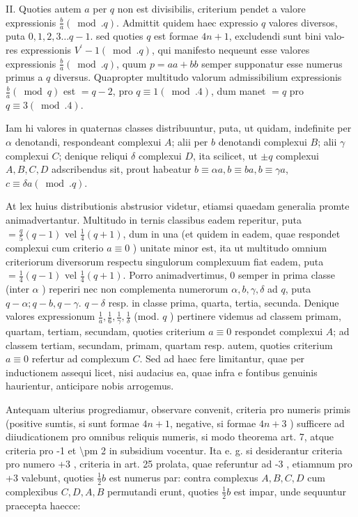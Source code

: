 \documentclass[10pt]{article}
\begin{document}
II. Quoties autem \(a\) per \(q\) non est divisibilis, criterium pendet a valore expressionis \(\frac{b}{a}(\bmod . q)\). Admittit quidem haec expressio \(q\) valores diversos, puta \(0,1,2,3 \ldots q-1\). sed quoties \(q\) est formae \(4 n+1\), excludendi sunt bini valo-
res expressionis \(V^{\prime}-1(\bmod . q)\), qui manifesto nequeunt esse valores expressionis \(\frac{b}{a}(\bmod . q)\), quum \(p=a a+b b\) semper supponatur esse numerus primus a \(q\) diversus. Quapropter multitudo valorum admissibilium expressionis \(\frac{b}{a}(\bmod q)\) est \(=q-2\), pro \(q \equiv 1(\bmod .4)\), dum manet \(=q\) pro \(q \equiv 3(\bmod .4)\).

Iam hi valores in quaternas classes distribuuntur, puta, ut quidam, indefinite per \(\alpha\) denotandi, respondeant complexui \(A\); alii per \(b\) denotandi complexui \(B\); alii \(\gamma\) complexui \(C\); denique reliqui \(\delta\) complexui \(D\), ita scilicet, ut \(\pm q\) complexui \(A, B, C, D\) adscribendus sit, prout habeatur \(b \equiv \alpha a, b \equiv b a, b \equiv \gamma a\), \(c \equiv \delta a(\bmod . q)\).

At lex huius distributionis abstrusior videtur, etiamsi quaedam generalia promte animadvertantur. Multitudo in ternis classibus eadem reperitur, puta \(=\frac{q}{5}(q-1)\) vel \(\frac{1}{4}(q+1)\), dum in una (et quidem in eadem, quae respondet complexui cum criterio \(a \equiv 0\) ) unitate minor est, ita ut multitudo omnium criteriorum diversorum respectu singulorum complexuum fiat eadem, puta \(=\frac{1}{4}(q-1)\) vel \(\frac{1}{4}(q+1)\). Porro animadvertimus, 0 semper in prima classe (inter \(\alpha\) ) reperiri nec non complementa numerorum \(\alpha, b, \gamma, \delta\) ad \(q\), puta \(q-\alpha ; q-b, q-\gamma\). \(q-\delta\) resp. in classe prima, quarta, tertia, secunda. Denique valores expressionum \(\frac{1}{a}, \frac{1}{6}, \frac{1}{\gamma}, \frac{1}{\delta}\) (mod. \(q\) ) pertinere videmus ad classem primam, quartam, tertiam, secundam, quoties criterium \(a \equiv 0\) respondet complexui \(A\); ad classem tertiam, secundam, primam, quartam resp. autem, quoties criterium \(a \equiv 0\) refertur ad complexum \(C\). Sed ad haec fere limitantur, quae per inductionem assequi licet, nisi audacius ea, quae infra e fontibus genuinis haurientur, anticipare nobis arrogemus.

Antequam ulterius progrediamur, observare convenit, criteria pro numeris primis (positive sumtis, si sunt formae \(4 n+1\), negative, si formae \(4 n+3\) ) sufficere ad diiudicationem pro omnibus reliquis numeris, si modo theorema art. 7, atque criteria pro -1 et \textbackslash pm 2 in subsidium vocentur. Ita e. g. si desiderantur criteria pro numero +3 , criteria in art. 25 prolata, quae referuntur ad -3 , etiamnum pro +3 valebunt, quoties \(\frac{1}{2} b\) est numerus par: contra complexus \(A, B, C, D\) cum complexibus \(C, D, A, B\) permutandi erunt, quoties \(\frac{1}{2} b\) est impar, unde sequuntur praecepta haecce:
\end{document}
